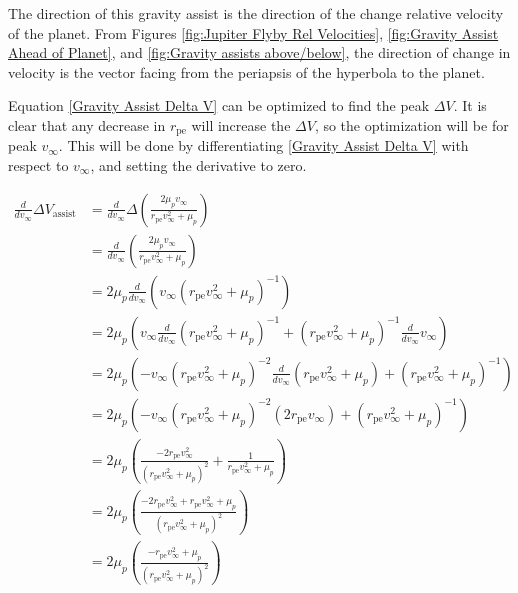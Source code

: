 \documentclass{article}
\begin{document}
The direction of this gravity assist is the direction of the change relative velocity of the planet. From Figures \ref{fig:Jupiter Flyby Rel Velocities}, \ref{fig:Gravity Assist Ahead of Planet}, and \ref{fig:Gravity assists above/below}, the direction of change in velocity is the vector facing from the periapsis of the hyperbola to the planet.

Equation \eqref{Gravity Assist Delta V} can be optimized to find the peak $\Delta V$. It is clear that any decrease in $r_\text{pe}$ will increase the $\Delta V$, so the optimization will be for peak $v_\infty$. This will be done by differentiating \eqref{Gravity Assist Delta V} with respect to $v_\infty$, and setting the derivative to zero.

\begin{align*}
    \frac{d}{dv_\infty}\Delta V_\text{assist} & =\frac{d}{dv_\infty}\Delta\left(\frac{2\mu_p v_\infty}{r_\text{pe}v_\infty^2+\mu_p}\right)                                                         \\
                                              & =\frac{d}{dv_\infty}\left(\frac{2\mu_p v_\infty}{r_\text{pe}v_\infty^2+\mu_p}\right)                                                               \\
                                              & =2\mu_p\frac{d}{dv_\infty}\left(v_\infty(r_\text{pe}v_\infty^2+\mu_p)^{-1}\right)                                                                  \\
                                              & =2\mu_p\left(v_\infty\frac{d}{dv_\infty}(r_\text{pe}v_\infty^2+\mu_p)^{-1}+(r_\text{pe}v_\infty^2+\mu_p)^{-1}\frac{d}{dv_\infty}v_\infty\right)    \\
                                              & =2\mu_p\left(-v_\infty(r_\text{pe}v_\infty^2+\mu_p)^{-2}\frac{d}{dv_\infty}(r_\text{pe}v_\infty^2+\mu_p)+(r_\text{pe}v_\infty^2+\mu_p)^{-1}\right) \\
                                              & =2\mu_p\left(-v_\infty(r_\text{pe}v_\infty^2+\mu_p)^{-2}(2r_\text{pe}v_\infty)+(r_\text{pe}v_\infty^2+\mu_p)^{-1}\right)                           \\
                                              & =2\mu_p\left(\frac{-2r_\text{pe}v_\infty^2}{(r_\text{pe}v_\infty^2+\mu_p)^2}+\frac{1}{r_\text{pe}v_\infty^2+\mu_p}\right)                          \\
                                              & =2\mu_p\left(\frac{-2r_\text{pe}v_\infty^2+r_\text{pe}v_\infty^2+\mu_p}{(r_\text{pe}v_\infty^2+\mu_p)^2}\right)                                    \\
                                              & =2\mu_p\left(\frac{-r_\text{pe}v_\infty^2+\mu_p}{(r_\text{pe}v_\infty^2+\mu_p)^2}\right)                                                           \\
\end{align*}
\end{document}
